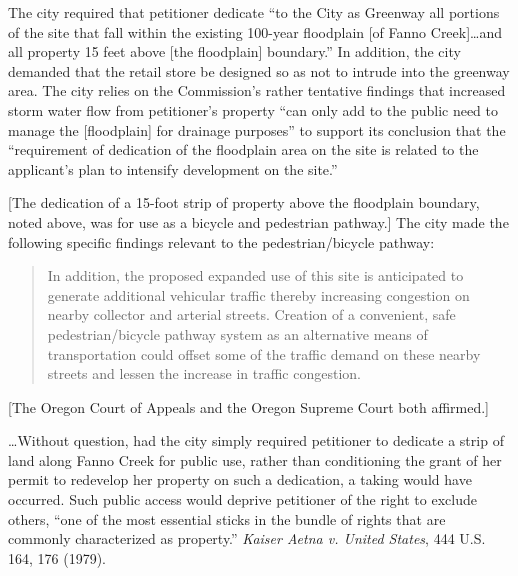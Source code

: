 The city required that petitioner dedicate ``to the City as Greenway all
portions of the site that fall within the existing 100-year floodplain [of Fanno
Creek]\ldots and all property 15 feet above [the floodplain]
boundary.''
In addition, the city demanded that the retail store be designed so as not to
intrude into the greenway area. The city relies on the Commission's rather
tentative findings that increased storm water flow from petitioner's property
``can only add to the public need to manage the [floodplain] for drainage
purposes'' to support its conclusion that the ``requirement of dedication of the
floodplain area on the site is related to the applicant's plan to intensify
development on the site.'' 

[The dedication of a 15-foot strip of property above the floodplain boundary,
noted above, was for use as a bicycle and pedestrian pathway.]
The city made the following specific findings relevant to the
pedestrian/bicycle pathway:
\begin{quote}
In addition, the proposed expanded use of this site is anticipated to generate
additional vehicular traffic thereby increasing congestion on nearby collector
and arterial streets. Creation of a convenient, safe pedestrian/bicycle pathway
system as an alternative means of transportation could offset some of the
traffic demand on these nearby streets and lessen the increase in traffic
congestion.
\end{quote}

[The Oregon Court of Appeals and the Oregon Supreme Court both affirmed.]



\ldots Without question,
had the city simply required petitioner to dedicate a strip of land along Fanno
Creek for public use, rather than conditioning the grant of her permit to
redevelop her property on such a dedication, a taking would have occurred. Such
public access would deprive petitioner of the right to exclude others, ``one of
the most essential sticks in the bundle of rights that are commonly
characterized as property.'' \textit{Kaiser Aetna v. United States}, 444 U.S.
164, 176 (1979).

